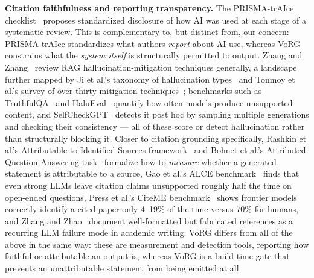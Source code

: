 \documentclass[11pt]{article}
\begin{document}
\textbf{Citation faithfulness and reporting transparency.} The PRISMA-trAIce checklist~\cite{prismatraice2025} proposes standardized disclosure of how AI was used at each stage of a systematic review. This is complementary to, but distinct from, our concern: PRISMA-trAIce standardizes what authors \emph{report} about AI use, whereas VoRG constrains what the \emph{system itself} is structurally permitted to output. Zhang and Zhang~\cite{zhang2025hallucination} review RAG hallucination-mitigation techniques generally, a landscape further mapped by Ji et al.'s taxonomy of hallucination types~\cite{ji2023survey} and Tonmoy et al.'s survey of over thirty mitigation techniques~\cite{tonmoy2024comprehensive}; benchmarks such as TruthfulQA~\cite{lin2022truthfulqa} and HaluEval~\cite{li2023halueval} quantify how often models produce unsupported content, and SelfCheckGPT~\cite{manakul2023selfcheckgpt} detects it post hoc by sampling multiple generations and checking their consistency — all of these score or detect hallucination rather than structurally blocking it. Closer to citation grounding specifically, Rashkin et al.'s Attributable-to-Identified-Sources framework~\cite{rashkin2023measuring} and Bohnet et al.'s Attributed Question Answering task~\cite{bohnet2022attributed} formalize how to \emph{measure} whether a generated statement is attributable to a source, Gao et al.'s ALCE benchmark~\cite{gao2023enabling} finds that even strong LLMs leave citation claims unsupported roughly half the time on open-ended questions, Press et al.'s CiteME benchmark~\cite{press2024citeme} shows frontier models correctly identify a cited paper only 4--19\% of the time versus 70\% for humans, and Zhang and Zhao~\cite{zhang2025citation} document well-formatted but fabricated references as a recurring LLM failure mode in academic writing. VoRG differs from all of the above in the same way: these are measurement and detection tools, reporting how faithful or attributable an output is, whereas VoRG is a build-time gate that prevents an unattributable statement from being emitted at all.
\end{document}
